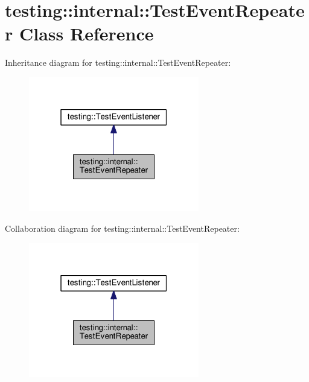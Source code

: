 \hypertarget{classtesting_1_1internal_1_1_test_event_repeater}{}\section{testing\+:\+:internal\+:\+:Test\+Event\+Repeater Class Reference}
\label{classtesting_1_1internal_1_1_test_event_repeater}


Inheritance diagram for testing\+:\+:internal\+:\+:Test\+Event\+Repeater\+:
\nopagebreak
\begin{figure}[H]
\begin{center}
\leavevmode
\includegraphics[width=211pt]{classtesting_1_1internal_1_1_test_event_repeater__inherit__graph}
\end{center}
\end{figure}


Collaboration diagram for testing\+:\+:internal\+:\+:Test\+Event\+Repeater\+:
\nopagebreak
\begin{figure}[H]
\begin{center}
\leavevmode
\includegraphics[width=211pt]{classtesting_1_1internal_1_1_test_event_repeater__coll__graph}
\end{center}
\end{figure}
